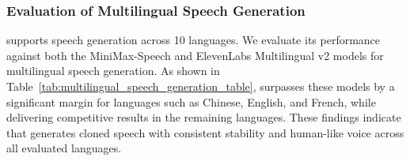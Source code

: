 






\subsubsection{Evaluation of Multilingual Speech Generation}
\method supports speech generation across 10 languages. We evaluate its performance against both the MiniMax-Speech and ElevenLabs Multilingual v2 models for multilingual speech generation. As shown in Table~\ref{tab:multilingual_speech_generation_table}, \method surpasses these models by a significant margin for languages such as Chinese, English, and French, while delivering competitive results in the remaining languages. These findings indicate that \method generates cloned speech with consistent  stability and human-like voice across all evaluated languages.


